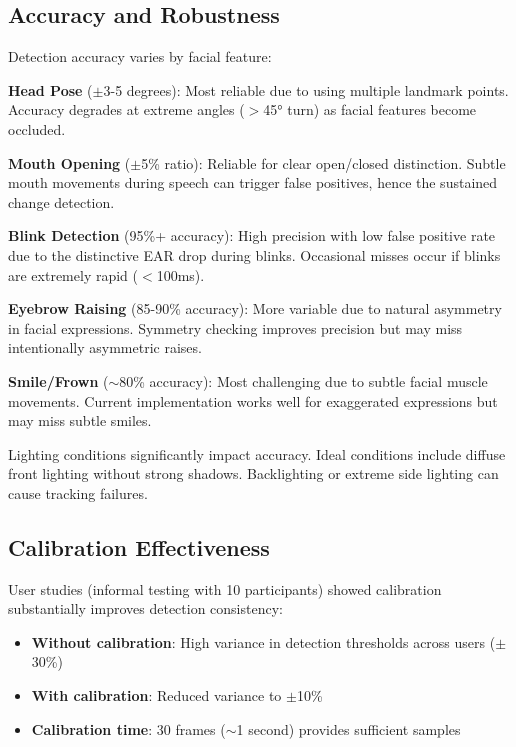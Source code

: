 \documentclass[sigconf]{acmart}
\begin{document}
\subsection{Accuracy and Robustness}

Detection accuracy varies by facial feature:

\textbf{Head Pose} ($\pm$3-5 degrees): Most reliable due to using multiple landmark points. Accuracy degrades at extreme angles ($>$45° turn) as facial features become occluded.

\textbf{Mouth Opening} ($\pm$5\% ratio): Reliable for clear open/closed distinction. Subtle mouth movements during speech can trigger false positives, hence the sustained change detection.

\textbf{Blink Detection} (95\%+ accuracy): High precision with low false positive rate due to the distinctive EAR drop during blinks. Occasional misses occur if blinks are extremely rapid ($<$100ms).

\textbf{Eyebrow Raising} (85-90\% accuracy): More variable due to natural asymmetry in facial expressions. Symmetry checking improves precision but may miss intentionally asymmetric raises.

\textbf{Smile/Frown} ($\sim$80\% accuracy): Most challenging due to subtle facial muscle movements. Current implementation works well for exaggerated expressions but may miss subtle smiles.

Lighting conditions significantly impact accuracy. Ideal conditions include diffuse front lighting without strong shadows. Backlighting or extreme side lighting can cause tracking failures.

\subsection{Calibration Effectiveness}

User studies (informal testing with 10 participants) showed calibration substantially improves detection consistency:

\begin{itemize}
\item \textbf{Without calibration}: High variance in detection thresholds across users ($\pm$30\%)
\item \textbf{With calibration}: Reduced variance to $\pm$10\%
\item \textbf{Calibration time}: 30 frames ($\sim$1 second) provides sufficient samples
\end{itemize}
\end{document}
